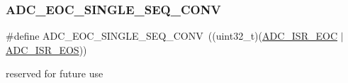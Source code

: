 \subsubsection{\texorpdfstring{A\+D\+C\+\_\+\+E\+O\+C\+\_\+\+S\+I\+N\+G\+L\+E\+\_\+\+S\+E\+Q\+\_\+\+C\+O\+NV}{ADC\_EOC\_SINGLE\_SEQ\_CONV}}
{\footnotesize\ttfamily \#define A\+D\+C\+\_\+\+E\+O\+C\+\_\+\+S\+I\+N\+G\+L\+E\+\_\+\+S\+E\+Q\+\_\+\+C\+O\+NV~((uint32\+\_\+t)(\hyperlink{group___peripheral___registers___bits___definition_ga949681e78b978c1ccd680f11137a1550}{A\+D\+C\+\_\+\+I\+S\+R\+\_\+\+E\+OC} $\vert$ \hyperlink{group___peripheral___registers___bits___definition_ga56b6edb70e1c04c5e03a935d2c945f50}{A\+D\+C\+\_\+\+I\+S\+R\+\_\+\+E\+OS}))}

reserved for future use 